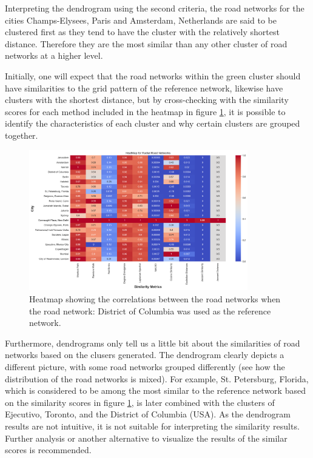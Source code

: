 Interpreting the dendrogram using the second criteria, the road networks for the cities Champs-Elysees, Paris and Amsterdam, Netherlands are said to be clustered first as they tend to have the cluster with the relatively shortest distance. Therefore they are the most similar than any other cluster of road networks at a higher level.

Initially, one will expect that the road networks within the green cluster should have similarities to the grid pattern of the reference network, likewise have clusters with the shortest distance, but by cross-checking with the similarity scores for each method included in the heatmap in figure \ref{fig:Heatmap showing the correlations for Radial Road Networks}, it is possible to identify the characteristics of each cluster and why certain clusters are grouped together.

\begin{figure}[!ht]
\centering
\includegraphics[width=0.85\textwidth,center]{picture/Radial/radialheatmap.png}
\caption[Heatmap showing the correlations for Radial Road Networks]{Heatmap showing the correlations between the road networks when the road network: District of Columbia was used as the reference network.}
\label{fig:Heatmap showing the correlations for Radial Road Networks}
\end{figure}


Furthermore, dendrograms only tell us a little bit about the similarities of road networks based on the clusers generated. The dendrogram clearly depicts a different picture, with some road networks grouped differently (see how the distribution of the road networks is mixed). For example, St. Petersburg, Florida, which is considered to be among the most similar to the reference network based on the similarity scores in figure \ref{fig:Heatmap showing the correlations for Radial Road Networks}, is later combined with the clusters of Ejecutivo, Toronto, and the District of Columbia (USA). As the dendrogram results are not intuitive, it is not suitable for interpreting the similarity results. Further analysis or another alternative to visualize the results of the similar scores is recommended.

